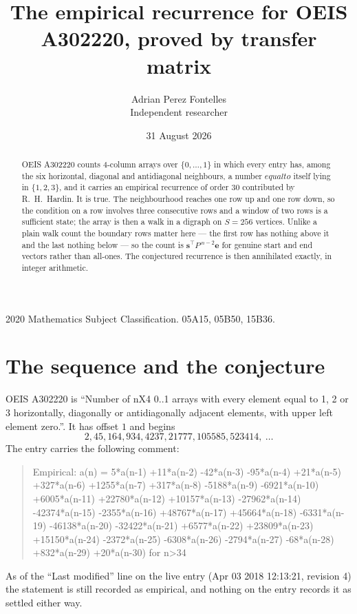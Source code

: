 \documentclass[11pt,a4paper]{article}
\title{The empirical recurrence for OEIS A302220, proved by transfer matrix}
\author{Adrian Perez Fontelles\\ \small Independent researcher}
\date{31 August 2026}
\theoremstyle{plain}
\theoremstyle{definition}
\begin{document}
\maketitle

\begin{abstract}
OEIS A302220 counts $4$-column arrays over $\{0,\dots,1\}$ in which every entry has,
among the six horizontal, diagonal and antidiagonal neighbours, a number $equal to$ itself lying in $\{1,2,3\}$, and it carries an empirical
recurrence of order $30$ contributed by R.~H.~Hardin. It is true. The neighbourhood
reaches one row up and one row down, so the condition on a row involves three consecutive
rows and a window of two rows is a sufficient state; the array is then a walk in a digraph
on $S=256$ vertices. Unlike a plain walk count the boundary rows matter here --- the first
row has nothing above it and the last nothing below --- so the count is
$\mathbf{s}^{\!\top}P^{\,n-2}\mathbf{e}$ for genuine start and end vectors rather than
all-ones. The conjectured recurrence is then annihilated exactly, in integer arithmetic.
\end{abstract}

\noindent\small 2020 Mathematics Subject Classification. 05A15, 05B50, 15B36.\normalsize

\section{The sequence and the conjecture}

OEIS A302220 is ``Number of nX4 0..1 arrays with every element equal to 1, 2 or 3 horizontally, diagonally or antidiagonally adjacent elements, with upper left element zero.''. It has offset
$1$ and begins
\[
2, 45, 164, 934, 4237, 21777, 105585, 523414,\ \dots
\]
The entry carries the following comment:
\begin{quote}\small
Empirical: a(n) = 5*a(n-1) +11*a(n-2) -42*a(n-3) -95*a(n-4) +21*a(n-5) +327*a(n-6) +1255*a(n-7) +317*a(n-8) -5188*a(n-9) -6921*a(n-10) +6005*a(n-11) +22780*a(n-12) +10157*a(n-13) -27962*a(n-14) -42374*a(n-15) -2355*a(n-16) +48767*a(n-17) +45664*a(n-18) -6331*a(n-19) -46138*a(n-20) -32422*a(n-21) +6577*a(n-22) +23809*a(n-23) +15150*a(n-24) -2372*a(n-25) -6308*a(n-26) -2794*a(n-27) -68*a(n-28) +832*a(n-29) +20*a(n-30) for n>34
\end{quote}
As of the ``Last modified'' line on the live entry (Apr 03 2018 12:13:21, revision
4) the statement is still recorded as empirical, and nothing on the entry
records it as settled either way.
\end{document}
